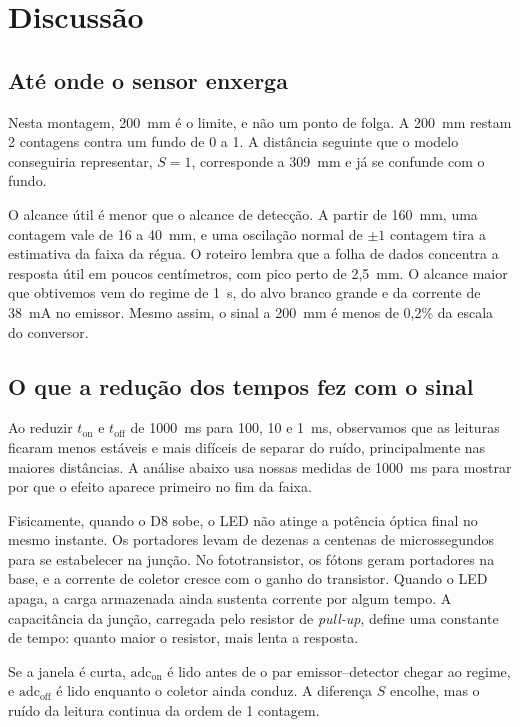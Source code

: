 \documentclass[11pt,a4paper]{article}
\begin{document}
\section{Discussão}

\subsection{Até onde o sensor enxerga}

Nesta montagem, 200~mm é o limite, e não um ponto de folga. A 200~mm restam 2 contagens contra um fundo de 0 a 1. A distância seguinte que o modelo conseguiria representar, $S = 1$, corresponde a 309~mm e já se confunde com o fundo.

O alcance útil é menor que o alcance de detecção. A partir de 160~mm, uma contagem vale de 16 a 40~mm, e uma oscilação normal de $\pm1$ contagem tira a estimativa da faixa da régua. O roteiro lembra que a folha de dados concentra a resposta útil em poucos centímetros, com pico perto de 2,5~mm. O alcance maior que obtivemos vem do regime de 1~s, do alvo branco grande e da corrente de 38~mA no emissor. Mesmo assim, o sinal a 200~mm é menos de 0,2\% da escala do conversor.

\subsection{O que a redução dos tempos fez com o sinal}

Ao reduzir $t_{\mathrm{on}}$ e $t_{\mathrm{off}}$ de 1000~ms para 100, 10 e 1~ms, observamos que as leituras ficaram menos estáveis e mais difíceis de separar do ruído, principalmente nas maiores distâncias. A análise abaixo usa nossas medidas de 1000~ms para mostrar por que o efeito aparece primeiro no fim da faixa.

Fisicamente, quando o D8 sobe, o LED não atinge a potência óptica final no mesmo instante. Os portadores levam de dezenas a centenas de microssegundos para se estabelecer na junção. No fototransistor, os fótons geram portadores na base, e a corrente de coletor cresce com o ganho do transistor. Quando o LED apaga, a carga armazenada ainda sustenta corrente por algum tempo. A capacitância da junção, carregada pelo resistor de \emph{pull-up}, define uma constante de tempo: quanto maior o resistor, mais lenta a resposta.

Se a janela é curta, $\mathrm{adc}_{\mathrm{on}}$ é lido antes de o par emissor--detector chegar ao regime, e $\mathrm{adc}_{\mathrm{off}}$ é lido enquanto o coletor ainda conduz. A diferença $S$ encolhe, mas o ruído da leitura continua da ordem de 1 contagem.
\end{document}
